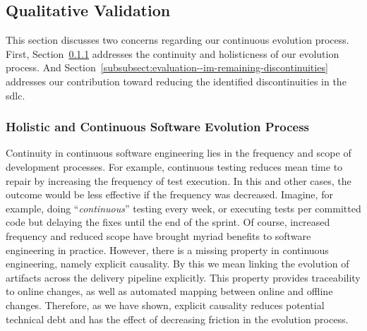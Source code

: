 \subsection{Qualitative Validation}
\label{subsect:evaluation--im-qualitative-validation}

This section discusses two concerns regarding our continuous evolution process. First, Section~\ref{subsubsect:evaluation--im-holistic-and-continuous-process} addresses the continuity and holisticness of our evolution process. And Section~\ref{subsubsect:evaluation--im-remaining-discontinuities} addresses our contribution toward reducing the identified discontinuities in the \gls{sdlc}.



\subsubsection{Holistic and Continuous Software Evolution Process}
\label{subsubsect:evaluation--im-holistic-and-continuous-process}

Continuity in continuous software engineering lies in the frequency and scope of development processes. For example, continuous testing reduces mean time to repair by increasing the frequency of test execution. In this and other cases, the outcome would be less effective if the frequency was decreased. Imagine, for example, doing ``\emph{continuous}'' testing every week, or executing tests per committed code but delaying the fixes until the end of the sprint. Of course, increased frequency and reduced scope have brought myriad benefits to software engineering in practice. However, there is a missing property in continuous engineering, namely explicit causality. By this we mean linking the evolution of artifacts across the delivery pipeline explicitly. This property provides traceability to online changes, as well as automated mapping between online and offline changes. Therefore, as we have shown, explicit causality reduces potential technical debt and has the effect of decreasing friction in the evolution process.

